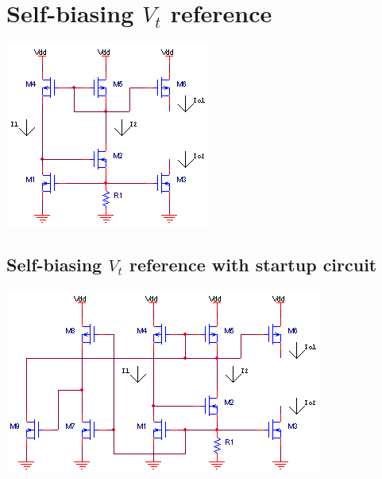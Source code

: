 \section{Self-biasing $V_{t}$ reference}
\begin{center}
	\includegraphics{schematics/self-biasing_Vt_reference.PNG}
\end{center}
\autocite[311]{analysis-design-analog-ics}

\subsection{Self-biasing $V_{t}$ reference with startup circuit}
\begin{center}
	\includegraphics{schematics/self-biasing_Vt_reference_startup.PNG}
\end{center}
\autocite[312]{analysis-design-analog-ics}


